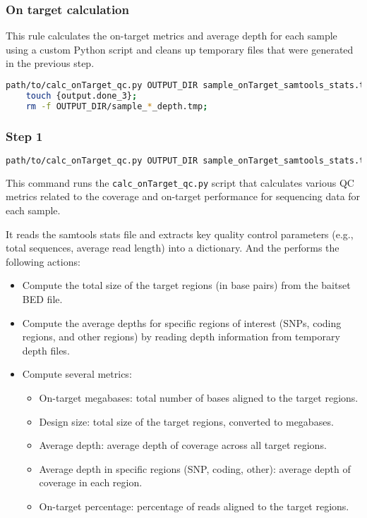\subsubsection{On target calculation}

This rule calculates the on-target metrics and average depth for each sample using a custom Python script and cleans up temporary files that were generated in the previous step.

\begin{lstlisting}[breaklines=true, language=bash]
    path/to/calc_onTarget_qc.py OUTPUT_DIR sample_onTarget_samtools_stats.txt sample.bam path/to/CORE_covered_regions.bed STATIC_DIR;
    touch {output.done_3};
    rm -f OUTPUT_DIR/sample_*_depth.tmp;
\end{lstlisting}

\subsubsection*{Step 1}
\begin{lstlisting}[breaklines=true, language=bash]
    path/to/calc_onTarget_qc.py OUTPUT_DIR sample_onTarget_samtools_stats.txt sample.bam path/to/CORE_covered_regions.bed STATIC_DIR;
\end{lstlisting}

This command runs the \texttt{calc\_onTarget\_qc.py} script that calculates various QC metrics related to the coverage and on-target performance for sequencing data for each sample.

It reads the samtools stats file and extracts key quality control parameters (e.g., total sequences, average read length) into a dictionary. And the performs the following actions:
\begin{itemize}
    \item Compute the total size of the target regions (in base pairs) from the baitset BED file.
    \item Compute the average depths for specific regions of interest (SNPs, coding regions, and other regions) by reading depth information from temporary depth files.
    \item Compute several metrics:
    \begin{itemize}
        \item On-target megabases: total number of bases aligned to the target regions.
        \item Design size: total size of the target regions, converted to megabases.
        \item Average depth: average depth of coverage across all target regions.
        \item Average depth in specific regions (SNP, coding, other): average depth of coverage in each region.
        \item On-target percentage: percentage of reads aligned to the target regions.
    \end{itemize}
\end{itemize}

